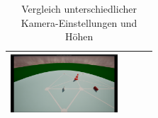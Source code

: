 \begin{table}[h!]
\begin{tabular}{|c|c|c|c|}
        \includegraphics[width=4cm]{img/unrealengine/h75_f120_w45.png} \\
        \hline
    \end{tabular}
    \caption{Vergleich unterschiedlicher Kamera-Einstellungen und Höhen}
\end{table}


